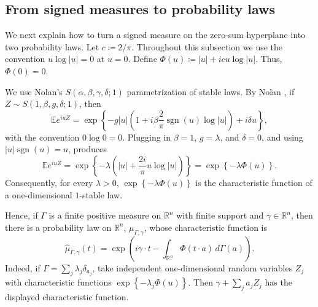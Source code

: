 \documentclass[11pt]{amsart}
\theoremstyle{plain}
\theoremstyle{definition}
\theoremstyle{remark}
\numberwithin{equation}{section}
\newcommand{\R}{\mathbb R}
\newcommand{\E}{\mathbb E}
\newcommand{\1}{\mathbf 1}
\DeclareMathOperator{\sgn}{sgn}
\begin{document}
\subsection{From signed measures to probability laws}

We next explain how to turn a signed measure on the zero-sum hyperplane into two probability laws. Let \(c\coloneqq2/\pi\). Throughout this subsection we use the convention \(u\log\lvert u\rvert=0\) at \(u=0\). Define \(\Phi\left(u\right)\coloneqq\lvert u\rvert+icu\log\lvert u\rvert\). Thus, \(\Phi\left(0\right)=0\).

We use Nolan's \(S\left(\alpha,\beta,\gamma,\delta;1\right)\) parametrization of stable laws. By Nolan \cite[\S1.3, Definition~1.8, Eq.~(1.6)]{Nolan2020BasicProperties}, if \(Z\sim S\left(1,\beta,g,\delta;1\right)\), then
\[
\E e^{iuZ}=\exp\left\{-g\lvert u\rvert\left(1+i\beta\frac{2}{\pi}\sgn\left(u\right)\log\lvert u\rvert\right)+i\delta u\right\},
\]
with the convention \(0\log0=0\). Plugging in \(\beta=1\), \(g=\lambda\), and \(\delta=0\), and using \(\lvert u\rvert\sgn\left(u\right)=u\), produces
\[
\E e^{iuZ}=\exp\left\{-\lambda\left(\lvert u\rvert+\frac{2i}{\pi}u\log\lvert u\rvert\right)\right\}=\exp\left\{-\lambda\Phi\left(u\right)\right\}.
\]
Consequently, for every \(\lambda>0\), \(\exp\left\{-\lambda\Phi\left(u\right)\right\}\) is the characteristic function of a one-dimensional \(1\)-stable law.

Hence, if \(\Gamma\) is a finite positive measure on \(\R^n\) with finite support and \(\gamma\in\R^n\), then there is a probability law on \(\R^n\), \(\mu_{\Gamma,\gamma}\), whose characteristic function is
\[
\hat\mu_{\Gamma,\gamma}\left(t\right)=\exp\left(i\gamma\cdot t-\int_{\R^n}\Phi\left(t\cdot a\right)\,d\Gamma\left(a\right)\right).
\]
Indeed, if \(\Gamma=\sum_j\lambda_j\delta_{a_j}\), take independent one-dimensional random variables \(Z_j\) with characteristic functions \(\exp\left\{-\lambda_j\Phi\left(u\right)\right\}\). Then \(\gamma+\sum_ja_jZ_j\) has the displayed characteristic function.
\end{document}
